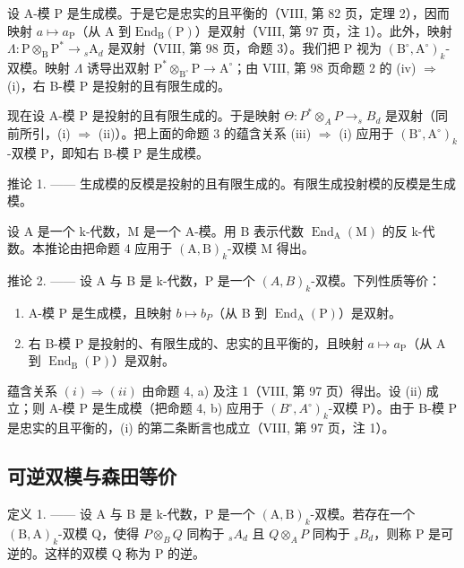 设 A-模 P 是生成模。于是它是忠实的且平衡的（VIII, 第 82 页，定理 2），因而映射 \(a \mapsto a_{\mathrm{P}}\)（从 A 到 \(\mathrm{End}_{\mathrm{B}}(\mathrm{P})\)）是双射（VIII, 第 97 页，注 1）。此外，映射 \(\Lambda : \mathrm{P} \otimes_{\mathrm{B}} \mathrm{P}^{*} \to {}_{s} \mathrm{A}_{d}\) 是双射（VIII, 第 98 页，命题 3）。我们把 P 视为 \((\mathrm{B}^{\circ}, \mathrm{A}^{\circ})_{k}\)-双模。映射 \(\Lambda\) 诱导出双射 \(\mathrm{P}^{*} \otimes_{\mathrm{B}^{\circ}} \mathrm{P} \to \mathrm{A}^{\circ}\)；由 VIII, 第 98 页命题 2 的 (iv) \(\Rightarrow\) (i)，右 B-模 P 是投射的且有限生成的。

现在设 A-模 P 是投射的且有限生成的。于是映射 \(\Theta: P^{*} \otimes_{A} P \to_{s} B_{d}\) 是双射（同前所引，(i) \(\Rightarrow\) (ii)）。把上面的命题 3 的蕴含关系 (iii) \(\Rightarrow\) (i) 应用于 \((\mathrm{B}^{\circ}, \mathrm{A}^{\circ})_{k}\)-双模 P，即知右 B-模 P 是生成模。

推论 1. —— 生成模的反模是投射的且有限生成的。有限生成投射模的反模是生成模。

设 A 是一个 k-代数，M 是一个 A-模。用 B 表示代数 \(\operatorname{End}_{\mathrm{A}}(\mathrm{M})\) 的反 k-代数。本推论由把命题 4 应用于 \((\mathrm{A},\mathrm{B})_{k}\)-双模 M 得出。

推论 2. —— 设 A 与 B 是 k-代数，P 是一个 \((A,B)_{k}\)-双模。下列性质等价：

\begin{enumerate}
\def\labelenumi{(\roman{enumi})}
\item
  A-模 P 是生成模，且映射 \(b \mapsto b_{P}\)（从 B 到 \(\operatorname{End}_{\mathrm{A}}(\mathrm{P})\)）是双射。
\item
  右 B-模 P 是投射的、有限生成的、忠实的且平衡的，且映射 \(a \mapsto a_{\mathrm{P}}\)（从 A 到 \(\operatorname{End}_{\mathrm{B}}(\mathrm{P})\)）是双射。
\end{enumerate}

蕴含关系 \((i) \Rightarrow (ii)\) 由命题 4, a) 及注 1（VIII, 第 97 页）得出。设 (ii) 成立；则 A-模 P 是生成模（把命题 4, b) 应用于 \((B^{\circ}, A^{\circ})_{k}\)-双模 P）。由于 B-模 P 是忠实的且平衡的，(i) 的第二条断言也成立（VIII, 第 97 页，注 1）。

\subsection{可逆双模与森田等价}

定义 1. —— 设 A 与 B 是 k-代数，P 是一个 \((\mathrm{A},\mathrm{B})_{k}\)-双模。若存在一个 \((\mathrm{B},\mathrm{A})_{k}\)-双模 Q，使得 \(P \otimes_{B} Q\) 同构于 \(_{s}A_{d}\) 且 \(Q \otimes_{A} P\) 同构于 \(_{s}B_{d}\)，则称 P 是可逆的。这样的双模 Q 称为 P 的逆。

